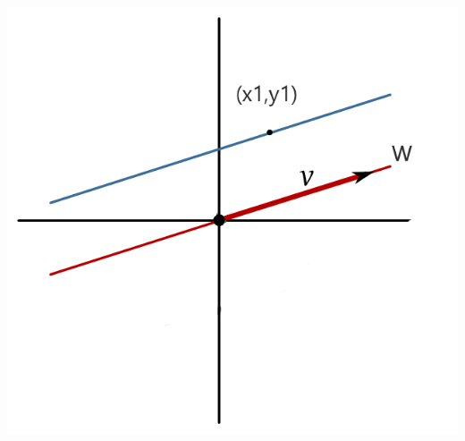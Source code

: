 \documentclass[10pt,a4paper,openright]{book}
\theoremstyle{break}
\begin{document}
\begin{center}
\includegraphics[scale=0.45]{Sistema asociado}
\end{center}
\end{document}
